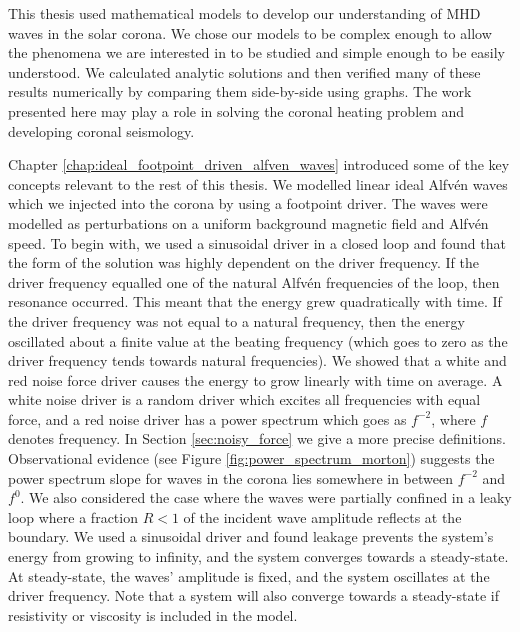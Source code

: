 This thesis used mathematical models to develop our understanding of MHD waves in the solar corona.
We chose our models to be complex enough to allow the phenomena we are interested in to be studied and simple enough to be easily understood. We calculated analytic solutions and then verified many of these results numerically by comparing them side-by-side using graphs. The work presented here may play a role in solving the coronal heating problem and developing coronal seismology. 

Chapter \ref{chap:ideal_footpoint_driven_alfven_waves} introduced some of the key concepts relevant to the rest of this thesis. We modelled linear ideal Alfv\'en waves which we injected into the corona by using a footpoint driver. The waves were modelled as perturbations on a uniform background magnetic field and Alfv\'en speed. To begin with, we used a sinusoidal driver in a closed loop and found that the form of the solution was highly dependent on the driver frequency. If the driver frequency equalled one of the natural Alfv\'en frequencies of the loop, then resonance occurred. This meant that the energy grew quadratically with time. If the driver frequency was not equal to a natural frequency, then the energy oscillated about a finite value at the beating frequency (which goes to zero as the driver frequency tends towards natural frequencies). We showed that a white and red noise force driver causes the energy to grow linearly with time on average. A white noise driver is a random driver which excites all frequencies with equal force, and a red noise driver has a power spectrum which goes as $f^{-2}$, where $f$ denotes frequency. In Section \ref{sec:noisy_force} we give a more precise definitions. Observational evidence (see Figure \ref{fig:power_spectrum_morton}) suggests the power spectrum slope for waves in the corona lies somewhere in between $f^{-2}$ and $f^0$. We also considered the case where the waves were partially confined in a leaky loop where a fraction $R<1$ of the incident wave amplitude reflects at the boundary. We used a sinusoidal driver and found leakage prevents the system's energy from growing to infinity, and the system converges towards a steady-state. At steady-state, the waves' amplitude is fixed, and the system oscillates at the driver frequency. Note that a system will also converge towards a steady-state if resistivity or viscosity is included in the model.

